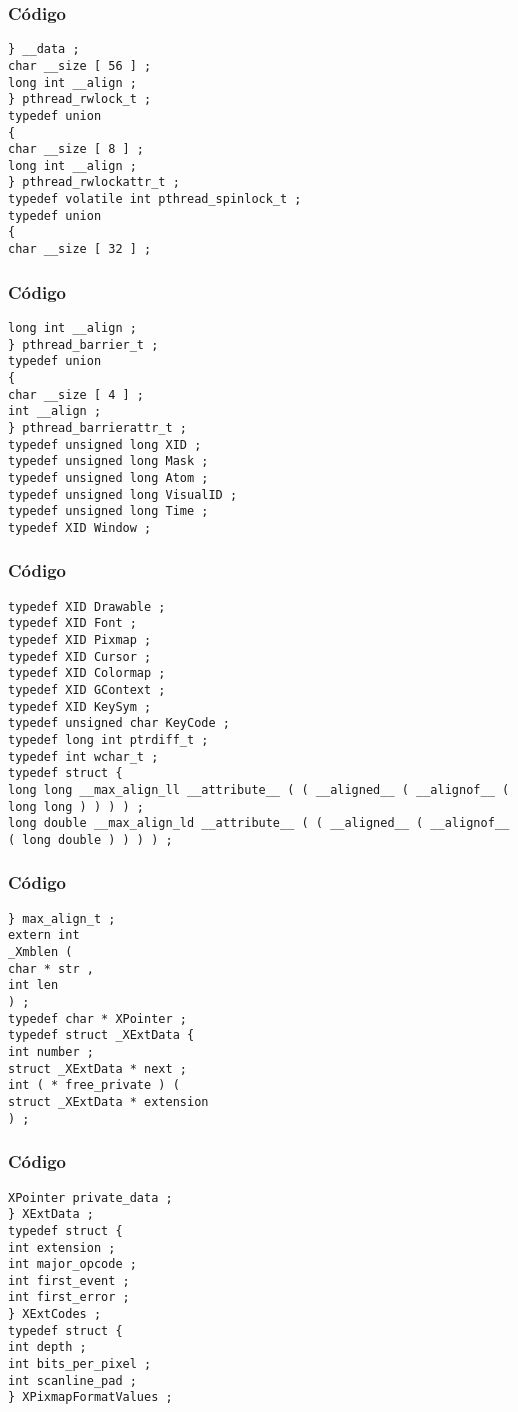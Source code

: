 \documentclass{beamer}
\begin{document}
\begin{frame}[fragile]
\frametitle{C\'odigo}
\begin{verbatim}
} __data ; 
char __size [ 56 ] ; 
long int __align ; 
} pthread_rwlock_t ; 
typedef union 
{ 
char __size [ 8 ] ; 
long int __align ; 
} pthread_rwlockattr_t ; 
typedef volatile int pthread_spinlock_t ; 
typedef union 
{ 
char __size [ 32 ] ; 
\end{verbatim}
\end{frame}
\begin{frame}[fragile]
\frametitle{C\'odigo}
\begin{verbatim}
long int __align ; 
} pthread_barrier_t ; 
typedef union 
{ 
char __size [ 4 ] ; 
int __align ; 
} pthread_barrierattr_t ; 
typedef unsigned long XID ; 
typedef unsigned long Mask ; 
typedef unsigned long Atom ; 
typedef unsigned long VisualID ; 
typedef unsigned long Time ; 
typedef XID Window ; 
\end{verbatim}
\end{frame}
\begin{frame}[fragile]
\frametitle{C\'odigo}
\begin{verbatim}
typedef XID Drawable ; 
typedef XID Font ; 
typedef XID Pixmap ; 
typedef XID Cursor ; 
typedef XID Colormap ; 
typedef XID GContext ; 
typedef XID KeySym ; 
typedef unsigned char KeyCode ; 
typedef long int ptrdiff_t ; 
typedef int wchar_t ; 
typedef struct { 
long long __max_align_ll __attribute__ ( ( __aligned__ ( __alignof__ ( long long ) ) ) ) ; 
long double __max_align_ld __attribute__ ( ( __aligned__ ( __alignof__ ( long double ) ) ) ) ; 
\end{verbatim}
\end{frame}
\begin{frame}[fragile]
\frametitle{C\'odigo}
\begin{verbatim}
} max_align_t ; 
extern int 
_Xmblen ( 
char * str , 
int len 
) ; 
typedef char * XPointer ; 
typedef struct _XExtData { 
int number ; 
struct _XExtData * next ; 
int ( * free_private ) ( 
struct _XExtData * extension 
) ; 
\end{verbatim}
\end{frame}
\begin{frame}[fragile]
\frametitle{C\'odigo}
\begin{verbatim}
XPointer private_data ; 
} XExtData ; 
typedef struct { 
int extension ; 
int major_opcode ; 
int first_event ; 
int first_error ; 
} XExtCodes ; 
typedef struct { 
int depth ; 
int bits_per_pixel ; 
int scanline_pad ; 
} XPixmapFormatValues ; 
\end{verbatim}
\end{frame}
\end{document}
